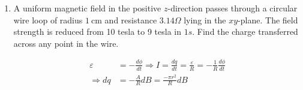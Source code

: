 \begin{enumerate}
\begin{enumerate}
\begin{answer}
\begin{align*}
\begin{array}{ccc}
	\partial / \partial x & \partial / \partial y & \partial / \partial z \\
	x & y & -z
	\end{array}\right|&=\hat{x}\left(-\frac{\partial z}{\partial y}-\frac{\partial y}{\partial z}\right)+\hat{y}\left(\frac{\partial x}{\partial z}+\frac{\partial z}{\partial x}\right)+\hat{z}\left(\frac{\partial y}{\partial x}-\frac{\partial x}{\partial y}\right)=0\\
	\text { (c) } \vec{\nabla} \times \vec{E}=K\left|\begin{array}{ccc}
	\hat{x} & \hat{y} & \hat{z} \\
	\partial / \partial x & \partial / \partial y & \partial / \partial z \\
	x & -y & 0
	\end{array}\right|&=\hat{x}\left(0+\frac{\partial y}{\partial z}\right)+\hat{y}\left(\frac{\partial x}{\partial z}-0\right)+\hat{z}\left(-\frac{\partial y}{\partial x}-\frac{\partial x}{\partial y}\right)=0\\
	\text { (d) } \vec{\nabla} \times \vec{E}=K\left|\begin{array}{ccc}
	\hat{x} & \hat{y} & \hat{z} \\
	\partial / \partial x & \partial / \partial y & \partial / \partial z \\
	y & -x & 2 z
	\end{array}\right|&=\hat{x}\left(\frac{\partial(2 z)}{\partial y}+\frac{\partial x}{\partial z}\right)+\hat{y}\left(-\frac{\partial x}{\partial z}-\frac{\partial(2 z)}{\partial x}\right)+\hat{z}\left(\frac{\partial y}{\partial x}-\frac{\partial y}{\partial y}\right)\\
	\Rightarrow \vec{\nabla} \times \vec{E}&=-\hat{z} \neq 0
	\end{align*}
\end{answer}
	\item A uniform magnetic field in the positive $z$-direction passes through a circular wire loop of radius $1 \mathrm{~cm}$ and resistance $3.14 \Omega$ lying in the $x y$-plane. The field strength is reduced from 10 tesla to 9 tesla in $1 s$. Find the charge transferred across any point in the wire. 
	\begin{answer}
		\begin{align*}
		\varepsilon&=-\frac{d \phi}{d t} \Rightarrow I=\frac{d q}{d t}=\frac{\varepsilon}{R}=-\frac{1}{R} \frac{d \phi}{d t}\\
		\Rightarrow d q&=-\frac{A}{R} d B=\frac{-\pi r^{2}}{R} d B\\

\end{align*}
\end{answer}
\end{enumerate}
\end{enumerate}
